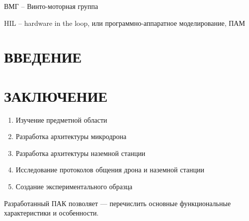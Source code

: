 \documentclass[a4paper,12pt]{article}
\begin{document}
ВМГ -- Винто-моторная группа

HIL -- hardware in the loop, или программно-аппаратное моделирование, ПАМ
\pagebreak

\tableofcontents

\pagebreak

\section*{\centering ВВЕДЕНИЕ}
\pagebreak
\pagebreak
\pagebreak
\pagebreak
\pagebreak
\pagebreak
\pagebreak

\section*{\centering ЗАКЛЮЧЕНИЕ}

\begin{enumerate} 
	\item Изучение предметной области
	\item Разработка архитектуры микродрона
	\item Разработка архитектуры наземной станции
	\item Исследование протоколов общения дрона и наземной станции
	\item Создание экспериментального образца
\end{enumerate}
Разработанный ПАК позволяет --- перечислить основные функциональные характеристики и особенности.
\pagebreak

\printbibliography

\pagebreak
\end{document}
